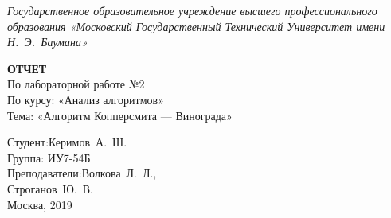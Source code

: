 \begin{titlepage}
	\centering

	{\footnotesize \itshape Государственное образовательное учреждение высшего профессионального образования «Московский Государственный Технический Университет имени Н.~Э.~Баумана»\\}

	\vspace{60mm}

	\textbf{ОТЧЕТ}\\
	По лабораторной работе №2\\
	По курсу: «Анализ алгоритмов»\\
	Тема: «Алгоритм Копперсмита — Винограда»\\

	\vspace{60mm}

	\hspace{70mm} Студент:\hfill Керимов~А.~Ш.\\
	\hspace{70mm} Группа: \hfill ИУ7-54Б\\
	\hspace{70mm} Преподаватели:\hfill Волкова~Л.~Л.,\\
	                            \hfill Строганов~Ю.~В.\\

	\vfill
	Москва, 2019
\end{titlepage}
